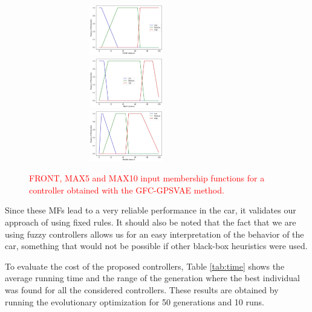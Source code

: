 \documentclass[10pt,journal,compsoc]{IEEEtran}
\begin{document}
%
\begin{figure}[h]	
  \begin{center}
    \includegraphics[width=8.5cm, height=2.2cm]{fig/FRONT.jpg}
    \includegraphics[width=8.5cm, height=2.2cm]{fig/MAX5.jpg}
    \includegraphics[width=8.5cm, height=2.2cm]{fig/MAX10.jpg}		
    \caption{\textcolor{red}{FRONT, MAX5 and MAX10 input membership functions for a controller obtained with the {\sf GFC-GPSVAE} method.}}
    \label{fig:frontmfs}
\end{center}	
\end{figure}
%
Since these MFs lead to a very reliable performance in the car, it
validates our approach of using fixed rules. It should
also be noted that the fact that we are using fuzzy controllers allows
us for an easy interpretation of the behavior of the car, something
that would not be possible if other black-box heuristics were used.


To evaluate the cost of the proposed controllers, Table \ref{tab:time} shows the average running time and the range of the generation where the best individual was found for all the considered controllers. These results are obtained by running the evolutionary optimization for 50 generations and 10 runs.  
\end{document}
